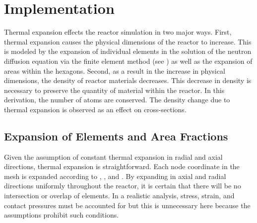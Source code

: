   
  


\section{Implementation}
  Thermal expansion effects the reactor simulation in two major ways. First,
  thermal expansion causes the physical dimensions of the reactor to increase. 
  This is modeled by the expansion of individual elements in the solution of the
  neutron diffusion equation via the finite element method (see
  ) as well as the expansion of areas within the 
  hexagons.  Second, as a result in the increase in physical dimensions, the 
  density of reactor materials decreases. This decrease in density is necessary
  to preserve the quantity of material within the reactor. In this derivation,
  the number of atoms are conserved. The density change due to thermal expansion 
  is observed as an effect on cross-sections.

  \subsection{Expansion of Elements and Area Fractions}
    Given the assumption of constant thermal expansion in radial and axial
    directions, thermal expansion is straightforward. Each node coordinate in
    the mesh is expanded according to , ,
    and . By expanding in axial and radial directions
    uniformly throughout the reactor, it is certain that there will be no
    intersection or overlap of elements. In a realistic analysis, stress,
    strain, and contact pressures must be accounted for but this is unnecessary
    here because the assumptions prohibit such conditions.

